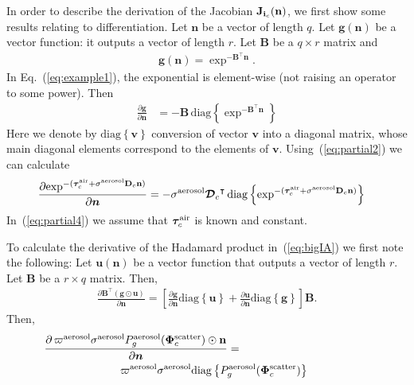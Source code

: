 \documentclass[a4paper]{article}
\newcommand{\OpDistance}{\bm{\mathcal{D}}}
\newcommand{\OpDiag}[1]{\mathrm{diag}\left\{#1\right\}}
\newcommand{\PartDeriv}[2]{\frac{\partial{#1}}{\partial{#2}}}
\newcommand{\vect}[1]{\bm{#1}}
\newcommand{\mat}[1]{\bm{#1}}
\newcommand{\transpose}[1]{{#1}^\intercal}
\begin{document}
In order to describe the derivation of the Jacobian ${\bf J}_{{\bf i}_c}({\bf n})$, we first show some results relating to differentiation. Let $\vect{n}$
be a vector of length $q$. Let $\vect{g}(\vect{n})$ be a vector
function: it outputs a vector of length $r$. Let $\mat{B}$ be a $q
\times r$ matrix and
\begin{align}
  \vect{g}(\vect{n}) = \exp^{-\transpose{\mat{B}}\vect{n}}.
  \label{eq:example1}
\end{align}
In Eq.~(\ref{eq:example1}), the exponential is element-wise (not
raising an operator to some power). Then
\begin{align}
  \label{eq:partial2}
  \PartDeriv{\vect{g}}{\vect{n}} &= - \mat{B} \,
  \OpDiag{\exp^{-\transpose{\mat{B}}\vect{n}}}
\end{align}
Here we denote by $\OpDiag{\vect{v}}$ conversion of vector $\vect{v}$
into a diagonal matrix, whose main diagonal elements correspond to the
elements of $\vect{v}$. Using~(\ref{eq:partial2}) we can calculate
\begin{align}
  \label{eq:partial4}
  \PartDeriv{\exp^{-(\vect{\tau}_c^{\rm air} + {\sigma}^{\rm aerosol}
      {\bf D}_c {\bf n})}}
  {\vect{n}} &= - {\sigma}^{\rm aerosol}\transpose{\OpDistance_c} \,
  \OpDiag{\exp^{-(\vect{\tau}_c^{\rm air} + {\sigma}^{\rm aerosol}
      {\bf D}_c {\bf n})}}
\end{align}
In~(\ref{eq:partial4}) we assume that $\vect{\tau}_c^{\rm air}$ is
known and constant.

To calculate the derivative of the Hadamard product
in~(\ref{eq:bigIA}) we first note the following: Let
$\vect{u}(\vect{n})$ be a vector function that outputs a vector of
length $r$. Let $\mat{B}$ be a $r \times q$ matrix. Then,
\begin{align}
  \label{eq:partial1}
  \PartDeriv{\transpose{\mat{B}} (\vect{g} \odot \vect{u})}{\vect{n}}
  = \left[ \PartDeriv{\vect{g}}{\vect{n}} \OpDiag{\vect{u}} +
    \PartDeriv{\vect{u}}{\vect{n}} \OpDiag{\vect{g}} \right] \mat{B}.
\end{align}
Then,
\begin{align}
  \label{eq:partial3}
  \PartDeriv{\, \varpi^{\rm aerosol}\sigma^{\rm aerosol} P^{\rm
      aerosol}_g(\vect{\Phi}^{\rm scatter}_c) \odot{\bf n}}{\vect{n}}
  =
  \;\;\;\;\;\;\;\;\;\;\;\;\;\;\;\;\;\;\;\;\;\;\;\;\;\;\;\;\;\;\;\;\;\;\;\;\;\;\;\;\;\;
  \nonumber \\
  \varpi^{\rm aerosol}\sigma^{\rm aerosol}\OpDiag{P^{\rm
      aerosol}_g(\vect{\Phi}^{\rm scatter}_c)}
  \;\;\;\;\;\;\;\;\;\;\;\;\;\;\;\;\;\;\;\;
\end{align}
\end{document}
